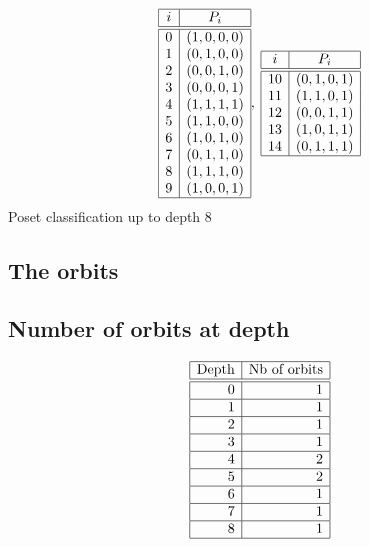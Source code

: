 \bigskip
{\renewcommand*{\arraystretch}{1.5}
$$
\begin{array}{|c|c|}
\hline
i & P_{i}\\
\hline
\hline
0 & ( 1, 0, 0, 0 )\\
1 & ( 0, 1, 0, 0 )\\
2 & ( 0, 0, 1, 0 )\\
3 & ( 0, 0, 0, 1 )\\
4 & ( 1, 1, 1, 1 )\\
5 & ( 1, 1, 0, 0 )\\
6 & ( 1, 0, 1, 0 )\\
7 & ( 0, 1, 1, 0 )\\
8 & ( 1, 1, 1, 0 )\\
9 & ( 1, 0, 0, 1 )\\
\hline
\end{array}
, \;
\begin{array}{|c|c|c|}
\hline
i & P_{i}\\
\hline
\hline
10 & ( 0, 1, 0, 1 )\\
11 & ( 1, 1, 0, 1 )\\
12 & ( 0, 0, 1, 1 )\\
13 & ( 1, 0, 1, 1 )\\
14 & ( 0, 1, 1, 1 )\\
\hline
\end{array}
$$}%
Poset classification up to depth 8\\

\subsection{The orbits}

\subsection{Number of orbits at depth}
$$
\begin{array}{|r|r|}
\hline
\mbox{Depth} & \mbox{Nb of orbits}\\
\hline
\hline
0 & 1\\
\hline
1 & 1\\
\hline
2 & 1\\
\hline
3 & 1\\
\hline
4 & 2\\
\hline
5 & 2\\
\hline
6 & 1\\
\hline
7 & 1\\
\hline
8 & 1\\
\hline
\end{array}
$$

